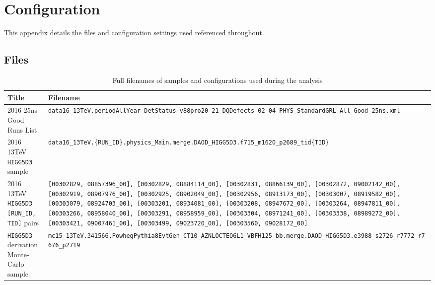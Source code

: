 \chapter{Configuration}\label{a:config}

This appendix details the files and configuration settings used referenced throughout.

\section{Files}
    \begin{table}[h]
        \caption{Full filenames of samples and configurations used during the analysis}
        \label{t:files}
        \medskip
        \centering
        \begin{tabularx}{\textwidth}{p{4.5cm} X}\toprule
            Title & Filename \\\midrule

            2016 $25$ns Good Runs List & \texttt{data16\_13TeV.periodAllYear\_DetStatus-v88\-pro20-21\_DQDefects\-00-02-04\_PHYS\_Standard\linebreak GRL\_All\_Good\_25ns.xml}\\
                        2016 13TeV \texttt{HIGG5D3} sample & \texttt{data16\_13TeV.\{RUN\_ID\}.physics\_Main.merge.\linebreak DAOD\_HIGG5D3.f715\_m1620\_p2689\_tid\{TID\}} \\
                        2016 13TeV \texttt{HIGG5D3 [RUN\_ID, TID]} pairs & \texttt{[00302829, 08857396\_00], [00302829, 08884114\_00], [00302831, 08866139\_00], [00302872, 09002142\_00], [00302919, 08907976\_00], [00302925, 08902049\_00], [00302956, 08913173\_00], [00303007, 08919582\_00], [00303079, 08924703\_00], [00303201, 08934081\_00], [00303208, 08947672\_00], [00303264, 08947811\_00], [00303266, 08958040\_00], [00303291, 08958959\_00], [00303304, 08971241\_00], [00303338, 08989272\_00], [00303421, 09007461\_00], [00303499, 09023720\_00], [00303560, 09028172\_00]} \\
            \texttt{HIGG5D3} derivation Monte-Carlo sample & \texttt{mc15\_13TeV.341566.PowhegPythia8EvtGen\linebreak\_CT10\_AZNLOCTEQ6L1\_VBFH125\_bb.merge.\linebreak DAOD\_HIGG5D3.e3988\_s2726\_r7772\_r7676\_p2719} \\\bottomrule
        \end{tabularx}\\[5pt]
    \end{table}
\endinput
